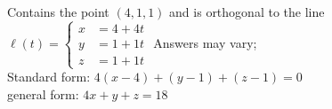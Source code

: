 {Contains the point $(4,1,1)$ and is orthogonal to the line\\
$\ell(t) = \left\{\begin{aligned} x&=4+4t \\
																	y&=1+1t \\
																	z&=1+1t \end{aligned}\right.$
}
{Answers may vary;\\
Standard form: $4(x-4)+(y-1)+(z-1)=0$\\
general form: $4x+y+z=18$
}

